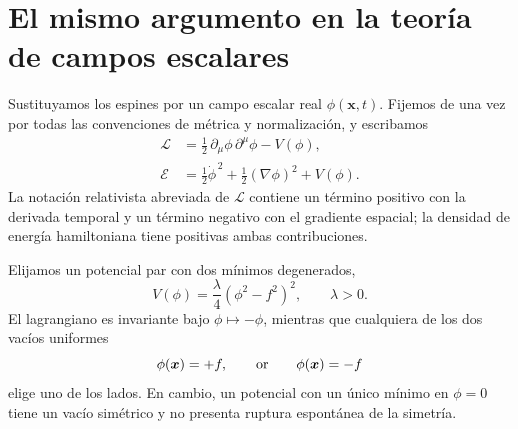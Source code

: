 \begin{classroomqa}
\end{classroomqa}

\begin{classroomqa}
\end{classroomqa}

\section{El mismo argumento en la teoría de campos escalares}

Sustituyamos los espines por un campo escalar real \(\phi(\bm{x},t)\). Fijemos de una vez por todas las convenciones de métrica y normalización, y escribamos
\begin{equation}
\begin{aligned}
  \mathcal L
  &=\frac12\,\partial_\mu\phi\,\partial^\mu\phi-V(\phi),
  \\
  \mathcal E
  &=\frac12\dot\phi^{\,2}+\frac12(\nabla\phi)^2+V(\phi).
\end{aligned}
  \label{eq:l07-real-scalar}
\end{equation}
La notación relativista abreviada de \(\mathcal L\) contiene un término positivo con la derivada temporal y un término negativo con el gradiente espacial; la densidad de energía hamiltoniana tiene positivas ambas contribuciones.

Elijamos un potencial par con dos mínimos degenerados,
\begin{equation}
  V(\phi)=\frac{\lambda}{4}\left(\phi^2-f^2\right)^2,
  \qquad \lambda>0.
  \label{eq:l07-double-well}
\end{equation}
El lagrangiano es invariante bajo \(\phi\mapsto-\phi\), mientras que cualquiera de los dos vacíos uniformes
\begin{equation}
  \phi(\bm{x})=+f,
  \qquad\hbox{or}\qquad
  \phi(\bm{x})=-f
\end{equation}
elige uno de los lados. En cambio, un potencial con un único mínimo en \(\phi=0\) tiene un vacío simétrico y no presenta ruptura espontánea de la simetría.

